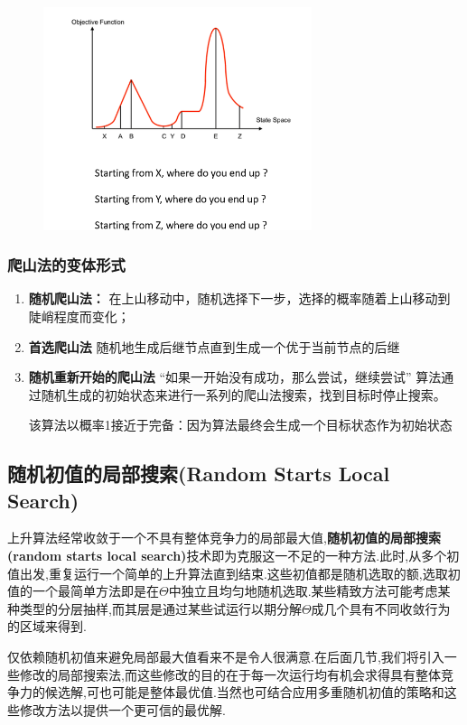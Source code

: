 \documentclass[11pt,a4paper,oneside]{book}
\begin{document}
\begin{figure}[H]
	\centering
	\includegraphics[width=0.7\textwidth]{10.png}
\end{figure}

\subsubsection{爬山法的变体形式}
\begin{enumerate}
	\item \textbf{随机爬山法：}
	在上山移动中，随机选择下一步，选择的概率随着上山移动到陡峭程度而变化；
	\item \textbf{首选爬山法}
	随机地生成后继节点直到生成一个优于当前节点的后继
	\item \textbf{随机重新开始的爬山法}
	“如果一开始没有成功，那么尝试，继续尝试”
	算法通过随机生成的初始状态来进行一系列的爬山法搜索，找到目标时停止搜索。
	
	该算法以概率1接近于完备：因为算法最终会生成一个目标状态作为初始状态
\end{enumerate}


\subsection{随机初值的局部搜索(Random Starts Local Search) }
上升算法经常收敛于一个不具有整体竞争力的局部最大值,\textbf{随机初值的局部搜索(random starts local search)}技术即为克服这一不足的一种方法.此时,从多个初值出发,重复运行一个简单的上升算法直到结束.这些初值都是随机选取的额,选取初值的一个最简单方法即是在$ \Theta $中独立且均匀地随机选取.某些精致方法可能考虑某种类型的分层抽样,而其层是通过某些试运行以期分解$ \Theta $成几个具有不同收敛行为的区域来得到.

仅依赖随机初值来避免局部最大值看来不是令人很满意.在后面几节,我们将引入一些修改的局部搜索法,而这些修改的目的在于每一次运行均有机会求得具有整体竞争力的候选解,可也可能是整体最优值.当然也可结合应用多重随机初值的策略和这些修改方法以提供一个更可信的最优解.
\end{document}
